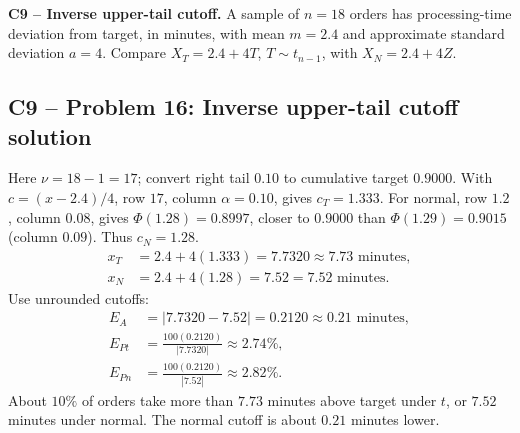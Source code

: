 {
\textbf{C9 -- Inverse upper-tail cutoff.} A sample of $n=18$ orders has processing-time deviation from target, in minutes, with mean $m=2.4$ and approximate standard deviation $a=4$. Compare $X_T=2.4+4T$, $T\sim t_{n-1}$, with $X_N=2.4+4Z$.
\label{sol:q16}
\subsection*{C9 -- Problem 16: Inverse upper-tail cutoff solution }
Here $\nu=18-1=17$; convert right tail $0.10$ to cumulative target $0.9000$.
With $c=(x-2.4)/4$, row $17$, column $\alpha=0.10$, gives $c_T=1.333$.
For normal, row $1.2$, column $0.08$, gives $\Phi(1.28)=0.8997$, closer to $0.9000$ than $\Phi(1.29)=0.9015$ (column $0.09$).
Thus $c_N=1.28$.
\[
 \begin{aligned}
 x_T&=2.4+4(1.333)=7.7320\approx\boxed{7.73\text{ minutes}},\\
 x_N&=2.4+4(1.28)=7.52=\boxed{7.52\text{ minutes}}.
 \end{aligned}
\]
Use unrounded cutoffs:
\[
 \begin{aligned}
 E_A&=|7.7320-7.52|=0.2120\approx\boxed{0.21\text{ minutes}},\\
 E_{Pt}&=\frac{100(0.2120)}{|7.7320|}\approx\boxed{2.74\%},\\
 E_{Pn}&=\frac{100(0.2120)}{|7.52|}\approx\boxed{2.82\%}.
 \end{aligned}
\]
About $10\%$ of orders take more than $7.73$ minutes above target under $t$, or $7.52$ minutes under normal.
The normal cutoff is about $0.21$ minutes lower.
\secInicio[sec:q16]
}
